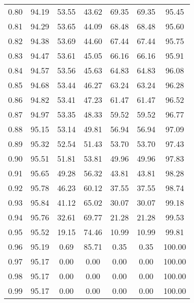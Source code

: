 \begin{tabular}{|c|c|c|c|c|c|c|}
      0.80 &     94.19 &     53.55 &      43.62 &   69.35 &      69.35 &         95.45 \\
      0.81 &     94.29 &     53.65 &      44.09 &   68.48 &      68.48 &         95.60 \\
      0.82 &     94.38 &     53.69 &      44.60 &   67.44 &      67.44 &         95.75 \\
      0.83 &     94.47 &     53.61 &      45.05 &   66.16 &      66.16 &         95.91 \\
      0.84 &     94.57 &     53.56 &      45.63 &   64.83 &      64.83 &         96.08 \\
      0.85 &     94.68 &     53.44 &      46.27 &   63.24 &      63.24 &         96.28 \\
      0.86 &     94.82 &     53.41 &      47.23 &   61.47 &      61.47 &         96.52 \\
      0.87 &     94.97 &     53.35 &      48.33 &   59.52 &      59.52 &         96.77 \\
      0.88 &     95.15 &     53.14 &      49.81 &   56.94 &      56.94 &         97.09 \\
      0.89 &     95.32 &     52.54 &      51.43 &   53.70 &      53.70 &         97.43 \\
      0.90 &     95.51 &     51.81 &      53.81 &   49.96 &      49.96 &         97.83 \\
      0.91 &     95.65 &     49.28 &      56.32 &   43.81 &      43.81 &         98.28 \\
      0.92 &     95.78 &     46.23 &      60.12 &   37.55 &      37.55 &         98.74 \\
      0.93 &     95.84 &     41.12 &      65.02 &   30.07 &      30.07 &         99.18 \\
      0.94 &     95.76 &     32.61 &      69.77 &   21.28 &      21.28 &         99.53 \\
      0.95 &     95.52 &     19.15 &      74.46 &   10.99 &      10.99 &         99.81 \\
      0.96 &     95.19 &      0.69 &      85.71 &    0.35 &       0.35 &        100.00 \\
      0.97 &     95.17 &      0.00 &       0.00 &    0.00 &       0.00 &        100.00 \\
      0.98 &     95.17 &      0.00 &       0.00 &    0.00 &       0.00 &        100.00 \\
      0.99 &     95.17 &      0.00 &       0.00 &    0.00 &       0.00 &        100.00 \\
\bottomrule
\end{tabular}
